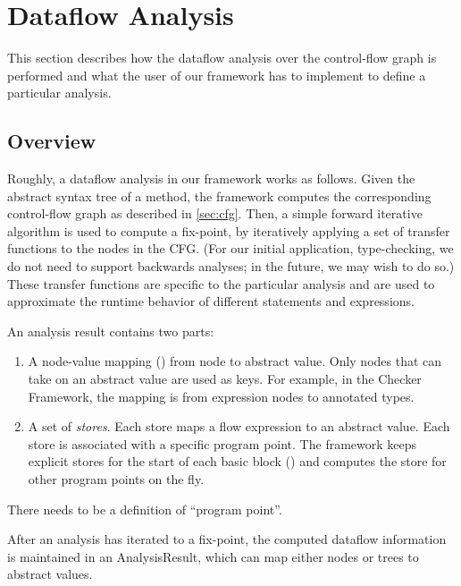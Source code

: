 \section{Dataflow Analysis}

This section describes how the dataflow analysis over the control-flow
graph is performed and what the user of our framework has to implement to
define a particular analysis.


\subsection{Overview}

Roughly, a dataflow analysis in our framework works as follows. Given the abstract syntax
tree of a method, the framework computes the corresponding control-flow graph as
described in \autoref{sec:cfg}. Then, a simple forward iterative algorithm is used to compute
a fix-point, by iteratively applying a set of transfer functions to the nodes in the
CFG\@.
(For our initial application, type-checking, we do not need to support
backwards analyses; in the future, we may wish to do so.)
 These transfer functions are specific to the particular analysis and are used
to approximate the runtime behavior of different statements and expressions.

An analysis result contains two parts:

\begin{enumerate}
\item
  A node-value mapping () from node to abstract value.
  Only nodes that can take on an abstract value are used as keys.
  For example,
  in the Checker Framework, the mapping is from expression nodes to
  annotated types.

\item
  A set of \emph{stores}.  Each store maps a flow expression to an abstract
  value.  Each store is associated with a specific program point.
  The framework keeps explicit
  stores for the start of each basic block () and
  computes the store for other program points on the fly.
\end{enumerate}

\begin{workinprogress}
There needs to be a definition of ``program point''.
\end{workinprogress}


After an analysis has iterated to a fix-point, the computed dataflow information is maintained in an AnalysisResult, which can map either nodes or trees to abstract values.




